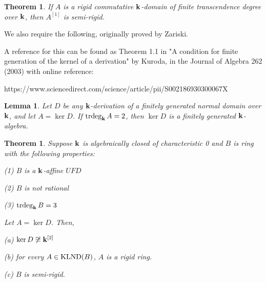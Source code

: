 \documentclass[12pt]{amsart}
\theoremstyle{plain}
\newcommand{\red}{\color{red}}
\newtheorem{theorem}[subsection]{Theorem}
\newtheorem{lemma}[subsection]{Lemma}
\theoremstyle{definition}
\newcommand{\trdeg}{	\operatorname{{\rm trdeg}}}
\newcommand{\bk}{{\ensuremath{\rm \bf k}}}
\newcommand{\klnd}{\operatorname{{\rm KLND}}}
\newcommand{\isom}{\cong}
\begin{document}
\begin{theorem} \label{semirigidityTheorem}
	If $A$ is a rigid commutative $\bk$-domain of finite transcendence degree over $\bk$, then $A^{[1]}$ is semi-rigid.
\end{theorem}

We also require the following, originally proved by Zariski. {\red A reference for this can be found as Theorem 1.1 in "A condition for finite generation of the kernel of a derivation" by Kuroda, in the Journal of Algebra 262 (2003) with online reference:

https://www.sciencedirect.com/science/article/pii/S002186930300067X
}

\begin{lemma}\label{fgkerneldim2}
	Let $D$ be any $\bk$-derivation of a finitely generated normal domain over $\bk$, and let $A = \ker D$. If $\trdeg_\bk A = 2$, then $\ker D$ is a finitely generated $\bk$-algebra.  
\end{lemma}

\begin{theorem}\label{trdeg3UFDnotRat}
	Suppose $\bk$ is algebraically closed of characteristic 0 and $B$ is ring with the following properties:
	
	(1) $B$ is a $\bk$-affine $UFD$
	
	(2) $B$ is not rational
	
	(3) $\trdeg_\bk B = 3$
	
	Let $A = \ker D$. Then,
	
	(a) $\ker D \not\isom \bk^{[2]}$
	
	(b) for every $A \in \klnd(B)$, $A$ is a rigid ring.
	
	(c) $B$ is semi-rigid. 
	
\end{theorem}
\end{document}

